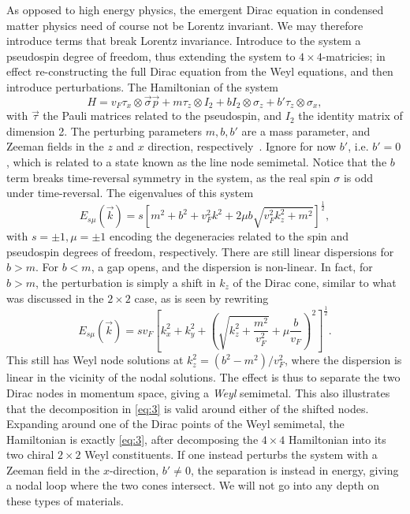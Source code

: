 As opposed to high energy physics, the emergent Dirac equation in condensed matter physics need of course not be Lorentz invariant.
We may therefore introduce terms that break Lorentz invariance.
Introduce to the system a pseudospin degree of freedom, thus extending the system to $4\times 4$-matricies;
in effect re-constructing the full Dirac equation from the Weyl equations, and then introduce perturbations.
The Hamiltonian of the system
\begin{equation}
  \label{eq:5}
  H = v_F \tau _x \otimes \vec{\sigma} \vec{p} + m \tau _z \otimes I_2 + b I_2 \otimes \sigma _z + b' \tau _z \otimes \sigma _x,
\end{equation}
with $\vec{\tau}$ the Pauli matrices related to the pseudospin, and $I_2$ the identity matrix of dimension 2.
The perturbing parameters $m, b, b'$ are a mass parameter, and Zeeman fields in the $z$ and $x$ direction, respectively~\cite{armitageWeylDiracSemimetals2018}.
Ignore for now $b'$, i.e. $b' = 0$, which is related to a state known as the line node semimetal.
Notice that the $b$ term breaks time-reversal symmetry in the system, as the real spin $\sigma $ is odd under time-reversal.
The eigenvalues of this system~\cite{armitageWeylDiracSemimetals2018}
\begin{equation}
  E_{s \mu }(\vec{k}) = s \left[
    m^2 + b^2 + v_{F}^2k^2 + 2 \mu  b \sqrt{v_F^2 k_z^2 + m^2}
  \right]^{\frac{1}{2}},
\end{equation}
with $s=\pm 1, \mu = \pm 1$ encoding the degeneracies related to the spin and pseudospin degrees of freedom, respectively.
There are still linear dispersions for $b > m$.
For $b < m$, a gap opens, and the dispersion is non-linear.
In fact, for \( b > m \), the perturbation is simply a shift in $k_z$ of the Dirac cone, similar to what was discussed in the \( 2\times 2 \) case, as  is seen by rewriting
\begin{equation}
  E_{s \mu }(\vec{k}) = s v_F
  \left[
    k_x^2 + k_y^2 + \left( \sqrt{k_z^2 +  \frac{m^2}{v_{F}^2}} + \mu \frac{b}{v_{F}} \right)^2
  \right]^{\frac{1}{2}}.
\end{equation}
This still has Weyl node solutions at $k_z^2 = (b^2-m^2) /v_F^2$, where the dispersion is linear in the vicinity of the nodal solutions.
The effect is thus to separate the two Dirac nodes in momentum space, giving a \emph{Weyl} semimetal.
This also illustrates that the decomposition in \cref{eq:3} is valid around either of the shifted nodes.
Expanding around one of the Dirac points of the Weyl semimetal, the Hamiltonian is exactly \cref{eq:3}, after decomposing the $4 \times 4$ Hamiltonian into its two chiral  $2\times 2$ Weyl constituents.
If one instead perturbs the system with a Zeeman field in the $x$-direction, $b' \neq 0$, the separation is instead in energy, giving a nodal loop where the two cones intersect.
We will not go into any depth on these types of materials.

